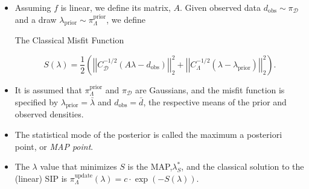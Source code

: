 \documentclass[11pt]{beamer}
\begin{document}
\begin{frame}

\begin{itemize}
	
	\item Assuming $f$ is linear, we define its matrix, $A$. Given observed data $d_{\text{obs}} \sim \pi_\mathcal{D}$ and a draw $\lambda_\text{prior}\sim \pi_\Lambda^\text{prior}$, we define

\begin{block}{The Classical Misfit Function}


\begin{equation} \label{eq:2}
S(\lambda)=\frac{1}{2}\left(\left|\left|C_\mathcal{D}^{-1/2}(A\lambda-d_{\text{obs}})\right|\right|_2^2+\left|\left|C_\Lambda^{-1/2}(\lambda-\lambda_{\text{prior}})\right|\right|_2^2\right).
\end{equation}

\end{block} 

\item It is assumed that $\pi_\Lambda^\text{prior}$ and $\pi_\mathcal{D}$ are Gaussians, and the misfit function is specified by $\lambda_{\text{prior}}=\bar{\lambda}$ and $d_{\text{obs}}=\bar{d}$, the respective means of the prior and observed densities.

\item The statistical mode of the posterior is called the maximum a posteriori point, or \textit{MAP point}.  

\item The $\lambda$ value that minimizes $S$ is the MAP,$\lambda_S^*$, and the classical solution to the (linear) SIP is $\pi_\Lambda^\text{update}(\lambda) = c\cdot \exp(-S(\lambda)).$ 


\end{itemize}


\end{frame}
\end{document}
